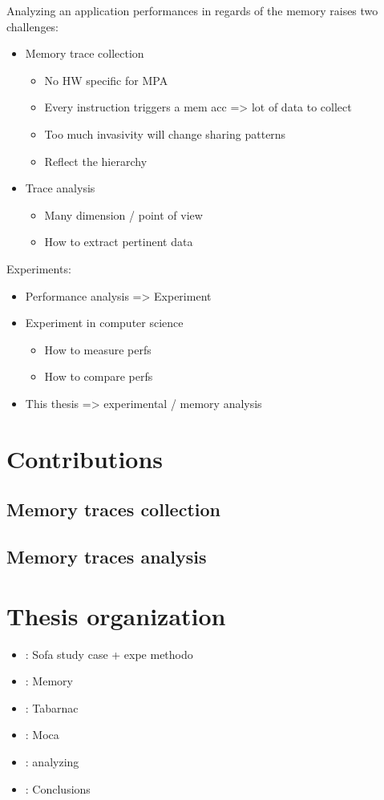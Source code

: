Analyzing an application performances in regards of the memory raises two challenges:
\begin{itemize}
    \item Memory trace collection
        \begin{itemize}
            \item No HW specific for MPA
            \item Every instruction triggers a mem acc => lot of data to collect
            \item Too much invasivity will change sharing patterns
            \item Reflect the hierarchy
        \end{itemize}
    \item Trace analysis
        \begin{itemize}
            \item Many dimension / point of view
            \item How to extract pertinent data
        \end{itemize}
\end{itemize}

Experiments:
\begin{itemize}
    \item Performance analysis => Experiment
    \item Experiment in computer science
        \begin{itemize}
            \item How to measure perfs
            \item How to compare perfs
        \end{itemize}
    \item This thesis => experimental / memory analysis
\end{itemize}

\section{Contributions}
\subsection{Memory traces collection}
\subsection{Memory traces analysis}
\section{Thesis organization}

\begin{itemize}
    \item  {}: Sofa study case + expe methodo
    \item  {}: Memory
    \item  {}: \gls{Tabarnac}
    \item  {}: \gls{Moca}
    \item  {}: analyzing
    \item  {}: Conclusions
\end{itemize}
